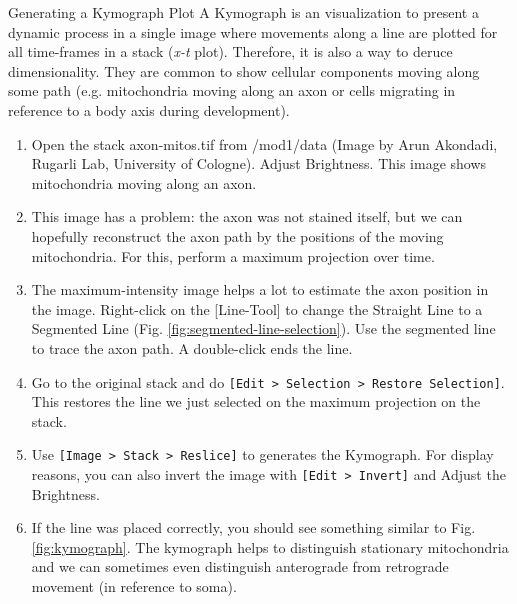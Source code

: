 \begin{taskbox}{Generating a Kymograph Plot}
A Kymograph is an visualization to present a dynamic process in a single image where movements along a line are plotted for all time-frames in a stack (\emph{x-t} plot). Therefore, it is also a way to deruce dimensionality. They are common to show cellular components moving along some path (e.g. mitochondria moving along an axon or cells migrating in reference to a body axis during development).

\begin{enumerate}
	\item Open the stack axon-mitos.tif from /mod1/data (Image by Arun Akondadi, Rugarli Lab, University of Cologne). Adjust Brightness. This image shows mitochondria moving along an axon.
	\item This image has a problem: the axon was not stained itself, but we can hopefully reconstruct the axon path by the positions of the moving mitochondria. For this, perform a maximum projection over time.
	\item The maximum-intensity image helps a lot to estimate the axon position in the image. Right-click on the [Line-Tool] to change the Straight Line to a Segmented Line (Fig. \ref{fig:segmented-line-selection}). Use the segmented line to trace the axon path. A double-click ends the line.	
	
	\begin{minipage}[t]{\linewidth}
		\begin{center}
		\medskip
		\label{fig:segmented-line-selection}
		\end{center}
	\end{minipage}
	
	\item Go to the original stack and do \texttt{[Edit > Selection > Restore Selection]}. This restores the line we just selected on the maximum projection on the stack.
	\item Use \texttt{[Image > Stack > Reslice]} to generates the Kymograph. For display reasons, you can also invert the image with \texttt{[Edit > Invert]} and Adjust the Brightness.
	\item If the line was placed correctly, you should see something similar to Fig. \ref{fig:kymograph}. The kymograph helps to distinguish stationary mitochondria and we can sometimes even distinguish anterograde from retrograde movement (in reference to soma).	
	

\end{enumerate}
\end{taskbox}
